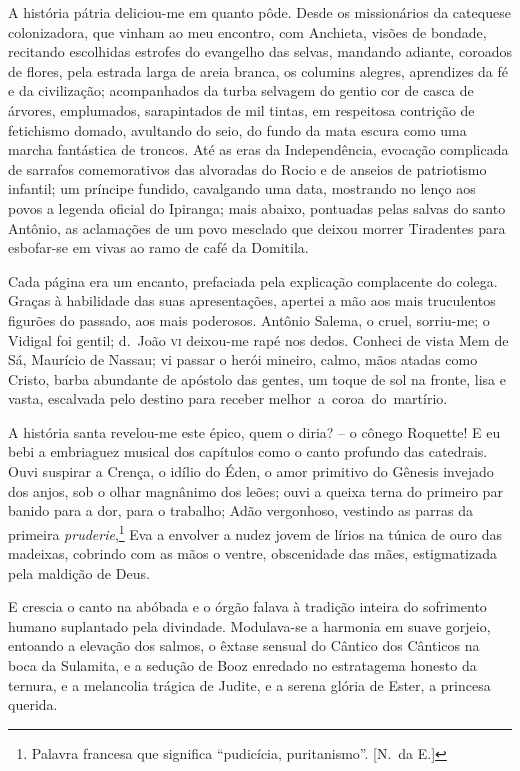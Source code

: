 A história pátria deliciou{}-me em quanto pôde. Desde os missionários da 
catequese colonizadora, que vinham ao meu encontro, com Anchieta, visões de
bondade, recitando escolhidas estrofes do evangelho das selvas,
mandando adiante, coroados de flores, pela estrada larga de areia
branca, os columins alegres, aprendizes da fé e da civilização;
acompanhados da turba selvagem do gentio cor de casca de árvores,
emplumados, sarapintados de mil tintas, em respeitosa contrição de
fetichismo domado, avultando do seio, do fundo da mata escura como uma
marcha fantástica de troncos. Até as eras da Independência, evocação
complicada de sarrafos comemorativos das alvoradas do Rocio e de
anseios de patriotismo infantil; um príncipe fundido, cavalgando uma
data, mostrando no lenço aos povos a legenda oficial do Ipiranga; mais
abaixo, pontuadas pelas salvas do santo Antônio, as aclamações de um
povo mesclado que deixou morrer Tiradentes para esbofar{}-se em vivas
ao ramo de café da Domitila. 

Cada página era um encanto, prefaciada pela explicação
complacente do colega. Graças à habilidade das suas apresentações,
apertei a mão aos mais truculentos figurões do passado, aos mais
poderosos. Antônio Salema, o cruel, sorriu{}-me; o Vidigal foi gentil;
d.~João \textsc{vi} deixou{}-me rapé nos dedos. Conheci de vista Mem de Sá,
Maurício de Nassau; vi passar o herói mineiro, calmo, mãos atadas como
Cristo, barba abundante de apóstolo das gentes, um toque de sol na
fronte, lisa e vasta, escalvada pelo destino para receber \mbox{melhor a
coroa do martírio.} 

A história santa revelou{}-me este épico, quem o
diria? -- o cônego Roquette! E eu bebi a embriaguez musical dos
capítulos como o canto profundo das catedrais. Ouvi suspirar a Crença,
o idílio do Éden, o amor primitivo do Gênesis invejado dos anjos, sob o
olhar magnânimo dos leões; ouvi a queixa terna do primeiro par banido
para a dor, para o trabalho; Adão vergonhoso, vestindo as parras da
primeira \textit{pruderie},\footnote{ Palavra francesa que significa ``pudicícia, puritanismo''. 
[N.~da E.]} Eva a envolver a nudez jovem de lírios na túnica de
ouro das madeixas, cobrindo com as mãos o ventre, obscenidade das mães,
estigmatizada pela maldição de Deus. 


E crescia o canto na abóbada e o
órgão falava à tradição inteira do sofrimento humano suplantado pela
divindade. Modulava{}-se a harmonia em suave gorjeio, entoando a
elevação dos salmos, o êxtase sensual do Cântico dos Cânticos na boca
da Sulamita, e a sedução de Booz enredado no estratagema honesto da
ternura, e a melancolia trágica de Judite, e a serena glória de Ester,
a princesa querida. 

